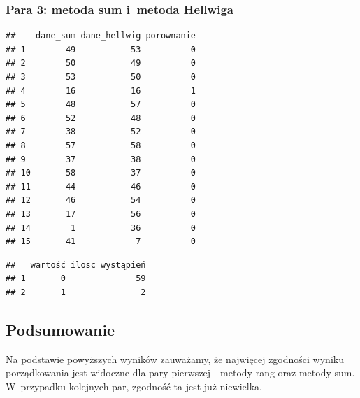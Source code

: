 \documentclass[12pt,a4paper]{report}
\begin{document}
{\subsubsection{Para 3: metoda sum i~metoda
Hellwiga}%
\begin{Shaded}
\begin{Highlighting}[]
\NormalTok{(}\NormalTok{,}\NormalTok{)}
\NormalTok{:}
\NormalTok{\{}
  \NormalTok{\{}
  \NormalTok{\}}
\NormalTok{\}}
\NormalTok{)}
\end{Highlighting}
\end{Shaded}%
\begin{verbatim}
##    dane_sum dane_hellwig porownanie
## 1        49           53          0
## 2        50           49          0
## 3        53           50          0
## 4        16           16          1
## 5        48           57          0
## 6        52           48          0
## 7        38           52          0
## 8        57           58          0
## 9        37           38          0
## 10       58           37          0
## 11       44           46          0
## 12       46           54          0
## 13       17           56          0
## 14        1           36          0
## 15       41            7          0
\end{verbatim}
\begin{Shaded}
\begin{Highlighting}[]
\NormalTok{(}
\NormalTok{(}\NormalTok{,}\NormalTok{)}
\end{Highlighting}
\end{Shaded}%
\begin{verbatim}
##   wartość ilosc wystąpień
## 1       0              59
## 2       1               2
\end{verbatim}
\subsection{Podsumowanie}\label{podsumowanie}
Na podstawie powyższych wyników zauważamy, że najwięcej zgodności wyniku
porządkowania jest widoczne dla pary pierwszej - metody rang oraz metody
sum. W~przypadku kolejnych par, zgodność ta jest już niewielka.
}
\end{document}
